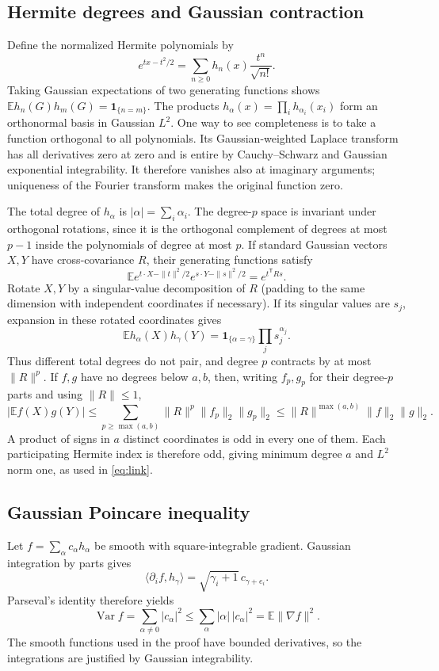 \documentclass[11pt]{article}
\newcommand{\E}{\mathbb E}
\newcommand{\Var}{\operatorname{Var}}
\newcommand{\1}{\mathbf 1}
\begin{document}
\subsection{Hermite degrees and Gaussian contraction}
Define the normalized Hermite polynomials by
\[
 e^{tx-t^2/2}=\sum_{n\ge0}h_n(x)\frac{t^n}{\sqrt{n!}}.
\]
Taking Gaussian expectations of two generating functions shows
$\E h_n(G)h_m(G)=\1_{\{n=m\}}$.
The products $h_\alpha(x)=\prod_i h_{\alpha_i}(x_i)$ form an
orthonormal basis in Gaussian $L^2$. One way to see completeness is
to take a function orthogonal to all polynomials. Its Gaussian-weighted
Laplace transform has all derivatives zero at zero and is entire by
Cauchy--Schwarz and Gaussian exponential integrability. It therefore
vanishes also at imaginary arguments; uniqueness of the Fourier
transform makes the original function zero.

The total degree of $h_\alpha$ is $|\alpha|=\sum_i\alpha_i$.
The degree-$p$ space is invariant under orthogonal rotations, since
it is the orthogonal complement of degrees at most $p-1$ inside the
polynomials of degree at most $p$. If standard Gaussian vectors $X,Y$
have cross-covariance $R$, their generating functions satisfy
\[
 \E e^{t\cdot X-\|t\|^2/2}e^{s\cdot Y-\|s\|^2/2}=e^{t^{\mathsf T}Rs}.
\]
Rotate $X,Y$ by a singular-value decomposition of $R$ (padding to the
same dimension with independent coordinates if necessary).
If its singular values are $s_j$, expansion in these rotated coordinates gives
\[
 \E h_\alpha(X)h_\gamma(Y)
      =\1_{\{\alpha=\gamma\}}\prod_j s_j^{\alpha_j}.
\]
Thus different total degrees do not pair, and degree $p$ contracts by
at most $\|R\|^p$. If $f,g$ have no degrees below $a,b$, then, writing
$f_p,g_p$ for their degree-$p$ parts and using $\|R\|\le1$,
\[
 |\E f(X)g(Y)|
 \le\sum_{p\ge\max(a,b)}\|R\|^p\|f_p\|_2\|g_p\|_2
 \le\|R\|^{\max(a,b)}\|f\|_2\|g\|_2.
\]
A product of signs in $a$ distinct coordinates is odd in every one
of them. Each participating Hermite index is therefore odd, giving
minimum degree $a$ and $L^2$ norm one, as used in \eqref{eq:link}.

\subsection{Gaussian Poincare inequality}
Let $f=\sum_\alpha c_\alpha h_\alpha$ be smooth with square-integrable
gradient. Gaussian integration by parts gives
\[
 \langle\partial_i f,h_\gamma\rangle
     =\sqrt{\gamma_i+1}\,c_{\gamma+e_i}.
\]
Parseval's identity therefore yields
\[
 \Var f=\sum_{\alpha\ne0}|c_\alpha|^2
       \le\sum_\alpha|\alpha|\,|c_\alpha|^2
       =\E\|\nabla f\|^2.
\]
The smooth functions used in the proof have bounded derivatives, so
the integrations are justified by Gaussian integrability.
\end{document}

